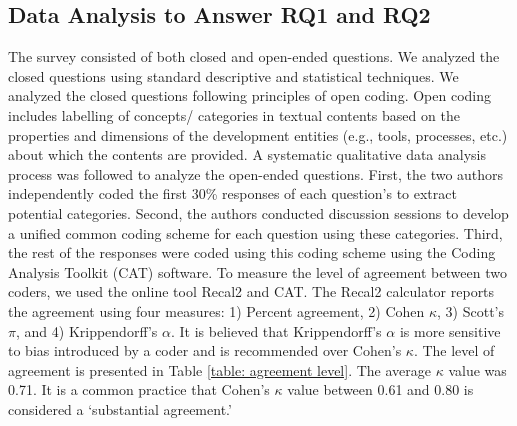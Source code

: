 % 

\subsection{Data Analysis to Answer RQ1 and RQ2}
\label{survey_data_collection}
The survey consisted of both closed and open-ended questions. 
We analyzed the closed questions using standard descriptive and statistical techniques. We analyzed the 
closed questions following principles of open coding. Open coding includes labelling of concepts/
categories in textual contents based on the properties and
dimensions of the development entities (e.g., tools, processes, etc.) about which the contents
are provided. A systematic qualitative data analysis process was followed to analyze the
open-ended questions. First, the two authors independently coded the first 30\%
responses of each question's to extract potential categories. Second, the
authors conducted discussion sessions to develop a unified common coding scheme
for each question using these categories. Third, the rest of the responses were
coded using this coding scheme using the Coding Analysis Toolkit
(CAT)\cite{Lu2008} software. To measure the level of agreement between two
coders, we used the online tool Recal2\cite{Recal2020} and CAT\cite{Lu2008}. The
Recal2 calculator reports the agreement using four measures: 1) Percent
agreement, 2) Cohen $\kappa$\cite{Cohen1960}, 3) Scott’s $\pi$\cite{scott1955},
and 4) Krippendorff’s $\alpha$\cite{krippendorff2004}. It is believed that
Krippendorff’s $\alpha$ is more sensitive to bias introduced by a coder and is
recommended\cite{Joyce2013} over Cohen's $\kappa$\cite{Cohen1960}. The level of
agreement is presented in Table \ref{table: agreement level}. The average
$\kappa$ value was 0.71. It is a common practice that Cohen's $\kappa$ value
between 0.61 and 0.80\cite{Landis1977} is considered a `substantial agreement.’
